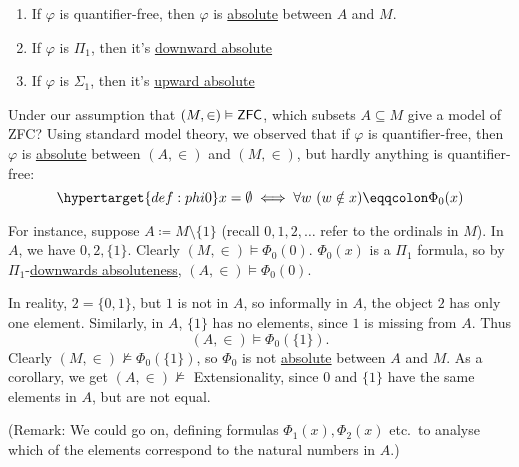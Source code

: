 \documentclass{article}
\let\models\vDash
\let\nModels\nvDash
\begin{document}
\begin{remark}
  \leavevmode
  \begin{enumerate}[label=(\alph*)]
    \item If $\varphi$ is quantifier-free, then $\varphi$ is \hyperlink{def:abso}{absolute} between $A$ and $M$.
    \item If $\varphi$ is \hyperlink{def:pi1}{$\Pi_1$}, then it's \hyperlink{def:abso}{downward absolute}
    \item If $\varphi$ is \hyperlink{def:sig1}{$\Sigma_1$}, then it's \hyperlink{def:abso}{upward absolute}
  \end{enumerate}
\end{remark}

\newlec
Under our assumption that $(M,\in) \models \text{\textsf{ZFC}}$, which subsets $A \subseteq M$ give a model of \textsf{ZFC}?
Using standard model theory, we observed that if $\varphi$ is quantifier-free, then $\varphi$ is \hyperlink{def:abso}{absolute} between $(A,\in)$ and $(M,\in)$, but hardly anything is quantifier-free:
\begin{equation*}
  \hypertarget{def:phi0}x = \emptyset \iff \forall w\ (w \notin x) \eqqcolon \Phi_0(x)
\end{equation*}

For instance, suppose $A \coloneqq M \setminus \{1\}$ (recall $0,1,2,\dotsc$ refer to the ordinals in $M$).
In $A$, we have $0,2,\{1\}$. Clearly $(M,\in) \models \Phi_0(0)$.
$\Phi_0(x)$ is a \hyperlink{def:pi1}{$\Pi_1$} formula, so by $\Pi_1$-\hyperlink{def:abso}{downwards absoluteness}, $(A,\in) \models \Phi_0(0)$.

In reality, $2 = \{0,1\}$, but $1$ is not in $A$, so informally in $A$, the object $2$ has only one element.
Similarly, in $A$, $\{1\}$ has no elements, since $1$ is missing from $A$. Thus
\begin{equation*}
  (A,\in) \models \Phi_0(\{1\}).
\end{equation*}
Clearly $(M,\in) \nModels \Phi_0(\{1\})$, so $\Phi_0$ is not \hyperlink{def:abso}{absolute} between $A$ and $M$.
As a corollary, we get $(A,\in) \nModels$ Extensionality, since $0$ and $\{1\}$ have the same elements in $A$, but are not equal.

(Remark: We could go on, defining formulas $\Phi_1(x), \Phi_2(x)$ etc.\ to analyse which of the elements correspond to the natural numbers in $A$.)
\end{document}
